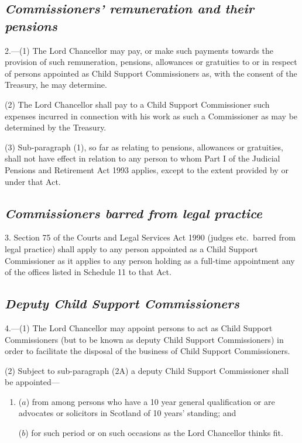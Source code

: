 \documentclass[12pt,a4paper]{article}
\begin{document}
\subsection*{\itshape Commissioners' remuneration and their pensions}

2.---(1) The Lord Chancellor may pay, or make such payments towards the provision of such remuneration, pensions, allowances or gratuities to or in respect of persons appointed as Child Support Commissioners as, with the consent of the Treasury, he may determine.

(2) The Lord Chancellor shall pay to a Child Support Commissioner such expenses incurred in connection with his work as such a Commissioner as may be determined by the Treasury.

(3) Sub-paragraph (1), so far as relating to pensions, allowances or gratuities, shall not have effect in relation to any person to whom Part I of the Judicial Pensions and Retirement Act 1993 applies, except to the extent provided by or under that Act.


\subsection*{\itshape Commissioners barred from legal practice}

3. Section 75 of the Courts and Legal Services Act 1990 (judges etc.\ barred from legal practice) shall apply to any person appointed as a Child Support Commissioner as it applies to any person holding as a full-time appointment any of the offices listed in Schedule 11 to that Act.

\subsection*{\itshape Deputy Child Support Commissioners}

4.---(1) The Lord Chancellor may appoint persons to act as Child Support Commissioners (but to be known as deputy Child Support Commissioners) in order to facilitate the disposal of the business of Child Support Commissioners.

(2) 
Subject to sub-paragraph (2A)  %
a deputy Child Support Commissioner shall be appointed—
\begin{enumerate}\item[]
($a$) from among persons who have a 10 year general qualification or are advocates or solicitors in Scotland of 10 years' standing; and

($b$) for such period or on such occasions as the Lord Chancellor thinks fit.
\end{enumerate}
\end{document}

